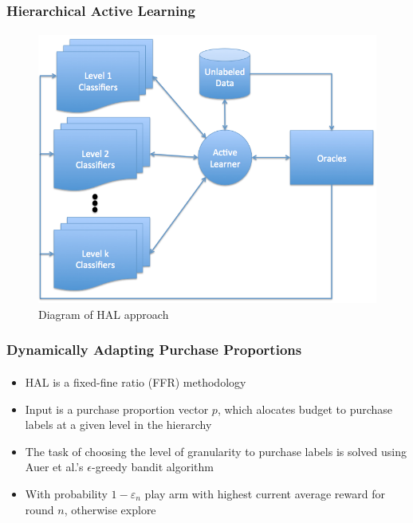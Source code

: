 \documentclass{beamer}
\begin{document}
\begin{frame}
    \frametitle{Hierarchical Active Learning}
    \framesubtitle{}
    \begin{figure}[!htb]
        \centering
        \includegraphics[width=0.65\columnwidth]{fig/AL2}
        \caption{Diagram of HAL approach}
        \label{fig:HALapproach}
    \end{figure}
\end{frame}
\begin{frame}
    \frametitle{Dynamically Adapting Purchase Proportions}
    \framesubtitle{}
    \begin{itemize}
      \item HAL is a fixed-fine ratio (FFR) methodology
      \item Input is a purchase proportion
vector $p$, which alocates budget to purchase labels at a given level in the hierarchy %
      \item The task of choosing the
level of granularity to purchase labels is solved using Auer et al.'s $\epsilon$-greedy bandit algorithm %
\item With probability $1-\varepsilon_n$ play arm with highest current average reward for round $n$, otherwise explore
    \end{itemize}


\end{frame}
\end{document}
